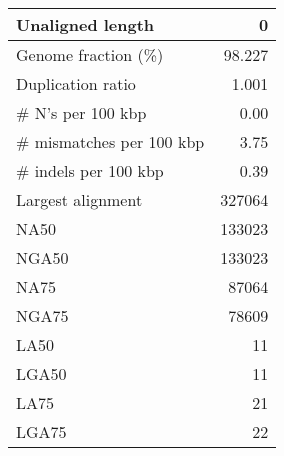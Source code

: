 \documentclass[12pt,a4paper]{article}
\begin{document}
\begin{table}[ht]
\begin{center}
\begin{tabular}{|l*{1}{|r}|}
Unaligned length & 0 \\ \hline
Genome fraction (\%) & 98.227 \\ \hline
Duplication ratio & 1.001 \\ \hline
\# N's per 100 kbp & 0.00 \\ \hline
\# mismatches per 100 kbp & 3.75 \\ \hline
\# indels per 100 kbp & 0.39 \\ \hline
Largest alignment & 327064 \\ \hline
NA50 & 133023 \\ \hline
NGA50 & 133023 \\ \hline
NA75 & 87064 \\ \hline
NGA75 & 78609 \\ \hline
LA50 & 11 \\ \hline
LGA50 & 11 \\ \hline
LA75 & 21 \\ \hline
LGA75 & 22 \\ \hline
\end{tabular}
\end{center}
\end{table}
\end{document}
